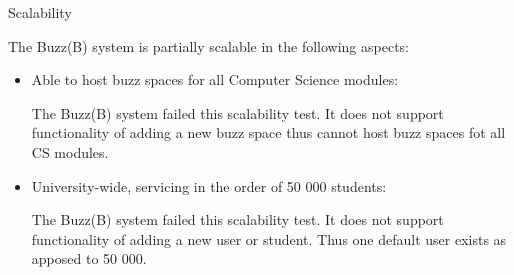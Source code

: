 \item Scalability

The Buzz(B) system is partially scalable in the following aspects:

\begin{itemize}
\item Able to host buzz spaces for all Computer Science modules:

The Buzz(B) system failed this scalability test. It does not support functionality of adding a new buzz space thus cannot host buzz spaces fot all CS modules.

\item University-wide, servicing in the order of 50 000 students:

The Buzz(B) system failed this scalability test. It does not support functionality of adding a new user or student. Thus one default user exists as apposed to 50 000.
\end{itemize}